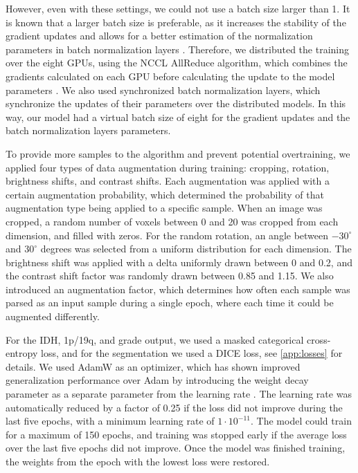 However, even with these settings, we could not use a batch size larger than 1.
It is known that a larger batch size is preferable, as it increases the stability of the gradient updates and allows for a better estimation of the normalization parameters in batch normalization layers \autocite{smith2018batch}.
Therefore, we distributed the training over the eight GPUs, using the NCCL AllReduce algorithm, which combines the gradients calculated on each GPU before calculating the update to the model parameters \autocite{woolleynccl}.
We also used synchronized batch normalization layers, which synchronize the updates of their parameters over the distributed models.
In this way, our model had a virtual batch size of eight for the gradient updates and the batch normalization layers parameters.

To provide more samples to the algorithm and prevent potential overtraining, we applied four types of data augmentation during training: cropping, rotation, brightness shifts, and contrast shifts.
Each augmentation was applied with a certain augmentation probability, which determined the probability of that augmentation type being applied to a specific sample.
When an image was cropped, a random number of voxels between 0 and 20 was cropped from each dimension, and filled with zeros.
For the random rotation, an angle between $-30^{\circ}$ and $30^{\circ}$ degrees was selected from a uniform distribution for each dimension.
The brightness shift was applied with a delta uniformly drawn between 0 and 0.2, and the contrast shift factor was randomly drawn between 0.85 and 1.15.
We also introduced an augmentation factor, which determines how often each sample was parsed as an input sample during a single epoch, where each time it could be augmented differently.

For the IDH, 1p/19q, and grade output, we used a masked categorical cross-entropy loss, and for the segmentation we used a DICE loss, see \cref{app:losses} for details.
We used AdamW as an optimizer, which has shown improved generalization performance over Adam by introducing the weight decay parameter as a separate parameter from the learning rate \autocite{loshchilov2017decoupled}.
The learning rate was automatically reduced by a factor of 0.25 if the loss did not improve during the last five epochs, with a minimum learning rate of $1\cdot10^{-11}$.
The model could train for a maximum of 150 epochs, and training was stopped early if the average loss over the last five epochs did not improve.
Once the model was finished training, the weights from the epoch with the lowest loss were restored.

